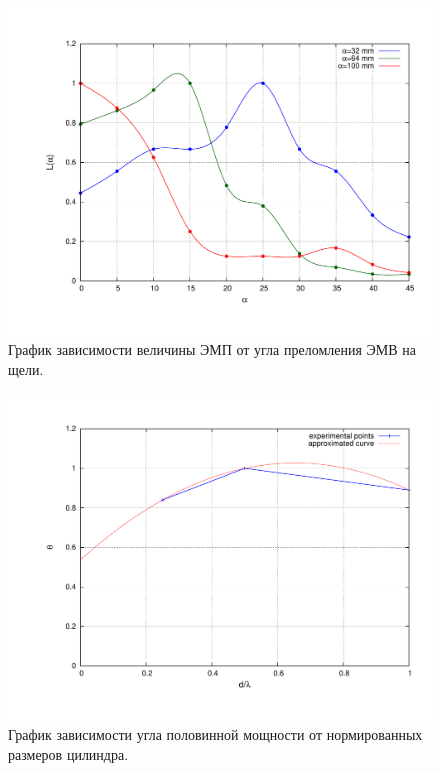 \documentclass[10pt,a4paper,oneside, reqno]{amsproc}
\begin{document}
\begin{figure}[h!t]
    \centering
    \includegraphics[width = \textwidth]{plot3.pdf}
    \vspace{-30pt}
    \caption{График зависимости величины ЭМП от угла преломления ЭМВ на щели.}
    \label{fig:plot3}
\end{figure}

\begin{figure}[h!t]
    \centering
    \includegraphics[width = \textwidth]{plot4-1.pdf}
    \vspace{-30pt}
    \caption{График зависимости угла половинной мощности от нормированных размеров цилиндра.}
    \label{fig:plot4}
\end{figure}
\end{document}
